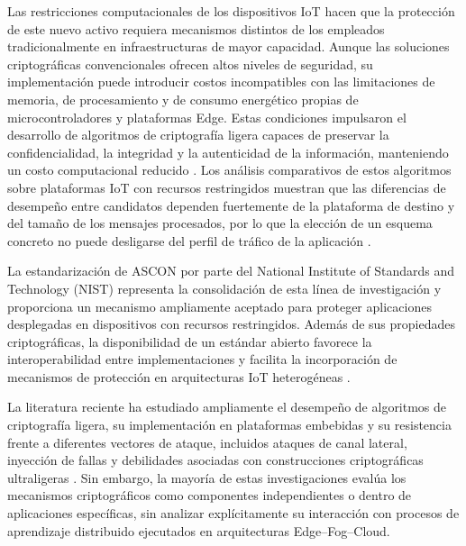 \documentclass[journal,article,submit,moreauthors]{Definitions/mdpi}
\begin{document}
Las restricciones computacionales de los dispositivos IoT hacen que la protección de este nuevo activo requiera mecanismos distintos de los empleados tradicionalmente en infraestructuras de mayor capacidad. Aunque las soluciones criptográficas convencionales ofrecen altos niveles de seguridad, su implementación puede introducir costos incompatibles con las limitaciones de memoria, de procesamiento y de consumo energético propias de microcontroladores y plataformas Edge. Estas condiciones impulsaron el desarrollo de algoritmos de criptografía ligera capaces de preservar la confidencialidad, la integridad y la autenticidad de la información, manteniendo un costo computacional reducido \cite{NISTIR8454,NIST800232,Gusita2025,Kaur2025}. Los análisis comparativos de estos algoritmos sobre plataformas IoT con recursos restringidos muestran que las diferencias de desempeño entre candidatos dependen fuertemente de la plataforma de destino y del tamaño de los mensajes procesados, por lo que la elección de un esquema concreto no puede desligarse del perfil de tráfico de la aplicación \cite{Sorescu2025}.

La estandarización de ASCON por parte del National Institute of Standards and Technology (NIST) representa la consolidación de esta línea de investigación y proporciona un mecanismo ampliamente aceptado para proteger aplicaciones desplegadas en dispositivos con recursos restringidos. Además de sus propiedades criptográficas, la disponibilidad de un estándar abierto favorece la interoperabilidad entre implementaciones y facilita la incorporación de mecanismos de protección en arquitecturas IoT heterogéneas \cite{NIST800232,Kaur2025}.

La literatura reciente ha estudiado ampliamente el desempeño de algoritmos de criptografía ligera, su implementación en plataformas embebidas y su resistencia frente a diferentes vectores de ataque, incluidos ataques de canal lateral, inyección de fallas y debilidades asociadas con construcciones criptográficas ultraligeras \cite{Kaur2025,Mirzaali2025,Gusita2025}. Sin embargo, la mayoría de estas investigaciones evalúa los mecanismos criptográficos como componentes independientes o dentro de aplicaciones específicas, sin analizar explícitamente su interacción con procesos de aprendizaje distribuido ejecutados en arquitecturas Edge--Fog--Cloud.
\end{document}
